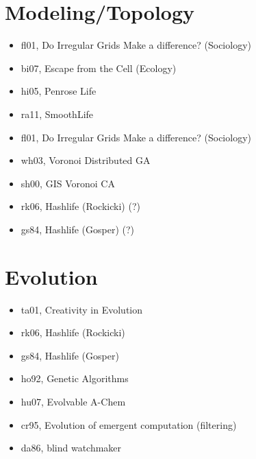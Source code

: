\section{Modeling/Topology}
\begin{itemize}[noitemsep, nolistsep]
\item fl01, Do Irregular Grids Make a difference? (Sociology)
\item bi07, Escape from the Cell (Ecology)

\item hi05, Penrose Life
\item ra11, SmoothLife

\item fl01, Do Irregular Grids Make a difference? (Sociology)
\item wh03, Voronoi Distributed GA
\item sh00, GIS Voronoi CA

\item rk06, Hashlife (Rockicki) (?)
\item gs84, Hashlife (Gosper) (?)
\end{itemize}

\section{Evolution}
\begin{itemize}
\item ta01, Creativity in Evolution
\item rk06, Hashlife (Rockicki)
\item gs84, Hashlife (Gosper)
\item ho92, Genetic Algorithms
\item hu07, Evolvable A-Chem
\item cr95, Evolution of emergent computation (filtering)
\item da86, blind watchmaker
\end{itemize}


